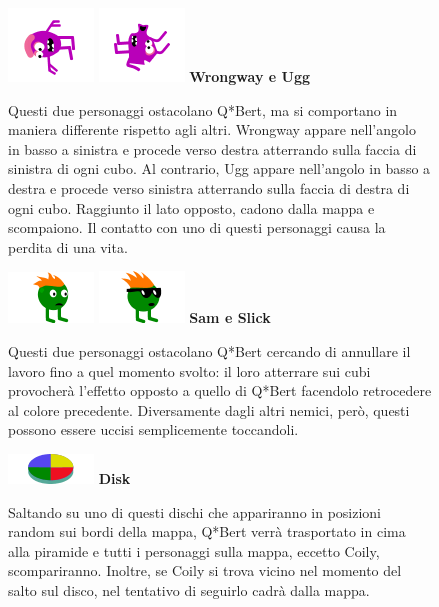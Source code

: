 \documentclass[a4paper,12pt, hidelinks]{report}
\begin{document}
\begin{figure}[H]
		\item
		\includegraphics[width=0.15\linewidth]{img/Wrongway}
		\includegraphics[width=0.15\linewidth]{img/Ugg}
		\label{img:Wrongway&Ugg}
		\textbf{Wrongway e Ugg}

		Questi due personaggi ostacolano Q*Bert, ma si comportano in maniera differente rispetto agli altri. Wrongway appare nell'angolo in basso a sinistra e procede verso destra atterrando sulla faccia di sinistra di ogni cubo. Al contrario, Ugg appare nell'angolo in basso a destra e procede verso sinistra atterrando sulla faccia di destra di ogni cubo. Raggiunto il lato opposto, cadono dalla mappa e scompaiono. Il contatto con uno di questi personaggi causa la perdita di una vita.

\end{figure}

\begin{figure}[H]
		\item
		\includegraphics[width=0.15\linewidth]{img/Sam}
		\includegraphics[width=0.15\linewidth]{img/Slick}
		\label{img:Sam&Slick}
		\textbf{Sam e Slick}

		Questi due personaggi ostacolano Q*Bert cercando di annullare il lavoro fino a quel momento svolto: il loro atterrare sui cubi provocherà l'effetto opposto a quello di Q*Bert facendolo retrocedere al colore precedente. Diversamente dagli altri nemici, però, questi possono essere uccisi semplicemente toccandoli.

\end{figure}

\begin{figure}[H]
		\item
		\includegraphics[width=0.15\linewidth]{img/Disk}
		\label{img:Disk}
		\textbf{Disk}

		Saltando su uno di questi dischi che appariranno in posizioni random sui bordi della mappa, Q*Bert verrà trasportato in cima alla piramide e tutti i personaggi sulla mappa, eccetto Coily, scompariranno. Inoltre, se Coily si trova vicino nel momento del salto sul disco, nel tentativo di seguirlo cadrà dalla mappa.

\end{figure}
\end{document}
